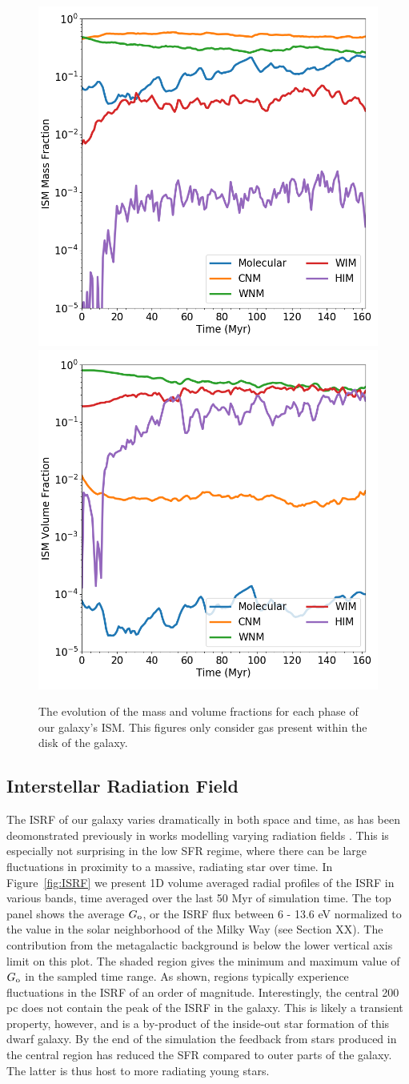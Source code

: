 \documentclass[twocolumn]{aastex61}
\begin{document}
\begin{figure}
\centering
\includegraphics[width=0.45\linewidth]{phase_mass_fraction_evolution_log.png}
\includegraphics[width=0.45\linewidth]{phase_volume_fraction_evolution_log.png}
\caption{The evolution of the mass and volume fractions for each phase of our galaxy's ISM. This figures only consider gas present within the disk of the galaxy.}
\label{fig:ISM_evolution}
\end{figure}

\subsection{Interstellar Radiation Field}
\label{sec:ISRF}

The ISRF of our galaxy varies dramatically in both space and time, as has been deomonstrated previously in works modelling varying radiation fields \citep{Parravano2003,Hu2017}. This is especially not surprising in the low SFR regime, where there can be large fluctuations in proximity to a massive, radiating star over time. In Figure~\ref{fig:ISRF} we present 1D volume averaged radial profiles of the ISRF in various bands, time averaged over the last 50 Myr of simulation time. The top panel shows the average $G_{\rm o}$, or the ISRF flux between 6 - 13.6 eV normalized to the value in the solar neighborhood of the Milky Way (see Section XX). The contribution from the metagalactic background is below the lower vertical axis limit on this plot. The shaded region gives the minimum and maximum value of $G_{\rm o}$ in the sampled time range. As shown, regions typically experience fluctuations in the ISRF of an order of magnitude. Interestingly, the central 200 pc does not contain the peak of the ISRF in the galaxy. This is likely a transient property, however, and is a by-product of the inside-out star formation of this dwarf galaxy. By the end of the simulation the feedback from stars produced in the central region has reduced the SFR compared to outer parts of the galaxy. The latter is thus host to more radiating young stars.
\end{document}
